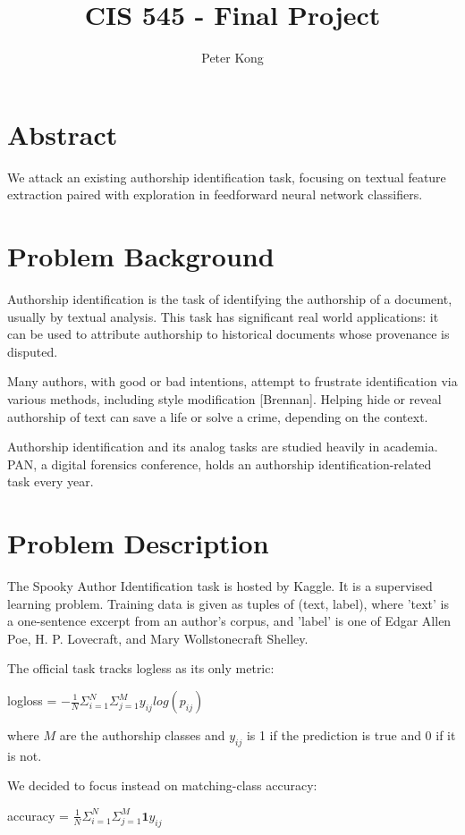 \documentclass[12pt]{article}
\title{CIS 545 - Final Project}
\author{Peter Kong}
\begin{document}
\maketitle



\hrulefill

\section{Abstract} We attack an existing authorship identification task, focusing on textual feature extraction paired with exploration in feedforward neural network classifiers.

\section{Problem Background}
Authorship identification is the task of identifying the authorship of a document, usually by textual analysis. This task has significant real world applications: it can be used to attribute authorship to historical documents whose provenance is disputed.

Many authors, with good or bad intentions, attempt to frustrate identification via various methods, including style modification [Brennan]. Helping hide or reveal authorship of text can save a life or solve a crime, depending on the context.

Authorship identification and its analog tasks are studied heavily in academia. PAN, a digital forensics conference, holds an authorship identification-related task every year. 




\section{Problem Description}
The Spooky Author Identification task is hosted by Kaggle. It is a supervised learning problem. Training data is given as tuples of (text, label), where 'text' is a one-sentence excerpt from an author's corpus, and 'label' is one of Edgar Allen Poe, H. P. Lovecraft, and Mary Wollstonecraft Shelley.

The official task tracks logless as its only metric:
\vskip 0.3in
\centerline{logloss = $-\frac{1}{N}\Sigma^N_{i=1}\Sigma^M_{j=1}y_{ij}log(p_{ij})$} 

where $M$ are the authorship classes and $y_{ij}$ is 1 if the prediction is true and 0 if it is not.

We decided to focus instead on matching-class accuracy: 
\vskip 0.3in
\centerline{accuracy = $\frac{1}{N}\Sigma^N_{i=1}\Sigma^M_{j=1}\textbf{1}y_{ij}$}
\end{document}
